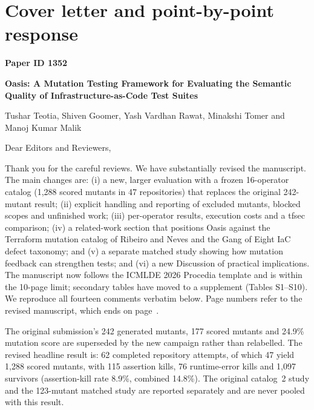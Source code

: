 \section*{Cover letter and point-by-point response}\label{sec:response}
\noindent\textbf{Paper ID 1352}\par
\noindent\textbf{Oasis: A Mutation Testing Framework for Evaluating the Semantic Quality of Infrastructure-as-Code Test Suites}\par
\noindent Tushar Teotia, Shiven Goomer, Yash Vardhan Rawat, Minakshi Tomer and Manoj Kumar Malik\par
\medskip
\noindent Dear Editors and Reviewers,

Thank you for the careful reviews. We have substantially revised the manuscript. The main changes are: (i) a new, larger evaluation with a frozen 16-operator catalog (1,288 scored mutants in 47 repositories) that replaces the original 242-mutant result; (ii) explicit handling and reporting of excluded mutants, blocked scopes and unfinished work; (iii) per-operator results, execution costs and a tfsec comparison; (iv) a related-work section that positions Oasis against the Terraform mutation catalog of Ribeiro and Neves and the Gang of Eight IaC defect taxonomy; and (v) a separate matched study showing how mutation feedback can strengthen tests; and (vi) a new Discussion of practical implications. The manuscript now follows the ICMLDE 2026 Procedia template and is within the 10-page limit; secondary tables have moved to a supplement (Tables S1--S10). We reproduce all fourteen comments verbatim below. Page numbers refer to the revised manuscript, which ends on page~\pageref{lastmanuscriptpage}.

The original submission's 242 generated mutants, 177 scored mutants and 24.9\% mutation score are superseded by the new campaign rather than relabelled. The revised headline result is: 62 completed repository attempts, of which 47 yield 1,288 scored mutants, with 115 assertion kills, 76 runtime-error kills and 1,097 survivors (assertion-kill rate 8.9\%, combined 14.8\%). The original catalog~2 study and the 123-mutant matched study are reported separately and are never pooled with this result.

